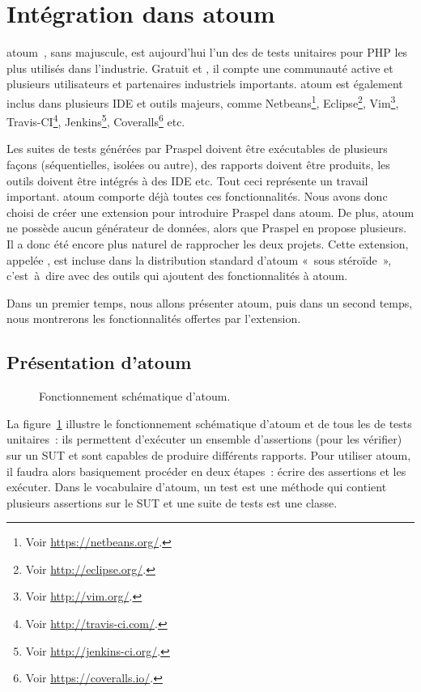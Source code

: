 \section{Intégration dans atoum}
\label{section:tools:atoum}

atoum~, sans majuscule, est aujourd'hui l'un des
 de tests unitaires pour PHP les plus utilisés dans
l'industrie. Gratuit et , il compte une communauté
active et plusieurs utilisateurs et partenaires industriels importants. atoum
est également inclus dans plusieurs IDE et outils majeurs, comme
Netbeans\footnote{Voir \url{https://netbeans.org/}.}, Eclipse\footnote{Voir
\url{http://eclipse.org/}.}, Vim\footnote{Voir \url{http://vim.org/}.},
Travis-CI\footnote{Voir \url{http://travis-ci.com/}.}, Jenkins\footnote{Voir
\url{http://jenkins-ci.org/}.}, Coveralls\footnote{Voir
\url{https://coveralls.io/}.} etc.

Les suites de tests générées par Praspel doivent être exécutables de plusieurs
façons (séquentielles, isolées ou autre), des rapports doivent être produits,
les outils doivent être intégrés à des IDE etc. Tout ceci représente un travail
important. atoum comporte déjà toutes ces fonctionnalités. Nous avons donc
choisi de créer une extension pour introduire Praspel dans atoum. De plus, atoum
ne possède aucun générateur de données, alors que Praspel en propose plusieurs.
Il a donc été encore plus naturel de rapprocher les deux projets. Cette
extension, appelée , est incluse dans la
distribution standard d'atoum «~sous stéroïde~», c'est~à~dire avec des outils
qui ajoutent des fonctionnalités à atoum.

Dans un premier temps, nous allons présenter atoum, puis dans un second temps,
nous montrerons les fonctionnalités offertes par l'extension.

\subsection{Présentation d'atoum}

\begin{figure}


\caption{\label{figure:tools:atoum} Fonctionnement schématique d'atoum.}

\end{figure}

La figure~\ref{figure:tools:atoum} illustre le fonctionnement schématique
d'atoum et de tous les  de tests unitaires~: ils permettent
d'exécuter un ensemble d'assertions (pour les vérifier) sur un SUT et sont
capables de produire différents rapports. Pour utiliser atoum, il faudra alors
basiquement procéder en deux étapes~: écrire des assertions et les exécuter.
Dans le vocabulaire d'atoum, un test est une méthode qui contient plusieurs
assertions sur le SUT et une suite de tests est une classe.

